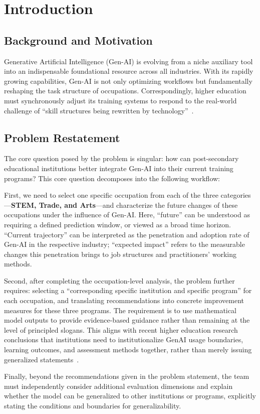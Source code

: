 \section{Introduction}
\subsection{Background and Motivation}
Generative Artificial Intelligence (Gen-AI) is evolving from a niche auxiliary tool into an indispensable foundational resource across all industries. With its rapidly growing capabilities, Gen-AI is not only optimizing workflows but fundamentally reshaping the task structure of occupations. Correspondingly, higher education must synchronously adjust its training systems to respond to the real-world challenge of ``skill structures being rewritten by technology''~\citep{mughal2025beyondautomationho,wong2025thefutureoflearnin}.

\subsection{Problem Restatement}
The core question posed by the problem is singular: how can post-secondary educational institutions better integrate Gen-AI into their current training programs? This core question decomposes into the following workflow:

First, we need to select one specific occupation from each of the three categories---\textbf{STEM, Trade, and Arts}---and characterize the future changes of these occupations under the influence of Gen-AI. Here, ``future'' can be understood as requiring a defined prediction window, or viewed as a broad time horizon. ``Current trajectory'' can be interpreted as the penetration and adoption rate of Gen-AI in the respective industry; ``expected impact'' refers to the measurable changes this penetration brings to job structures and practitioners' working methods.

Second, after completing the occupation-level analysis, the problem further requires: selecting a ``corresponding specific institution and specific program'' for each occupation, and translating recommendations into concrete improvement measures for these three programs. The requirement is to use mathematical model outputs to provide evidence-based guidance rather than remaining at the level of principled slogans. This aligns with recent higher education research conclusions that institutions need to institutionalize GenAI usage boundaries, learning outcomes, and assessment methods together, rather than merely issuing generalized statements~\citep{hamerman2024aninvestigationofg,jogezai2025generativeartifici}.

Finally, beyond the recommendations given in the problem statement, the team must independently consider additional evaluation dimensions and explain whether the model can be generalized to other institutions or programs, explicitly stating the conditions and boundaries for generalizability.
